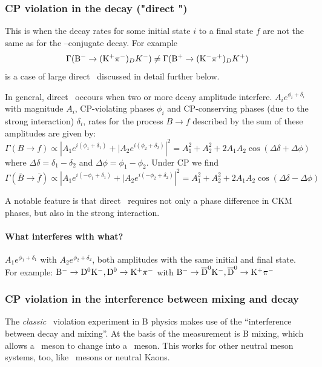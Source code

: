\subsubsection{CP violation in the decay ("direct \cpv")}
This is when the decay rates for some initial state $i$ to a final state $f$ are not the same as for the \cp--conjugate decay. For example
\[
\Gamma({\rm B^-} \to ({\rm K^+}{\rm \pi^-})_D K^-) \neq \Gamma({\rm B^+} \to ({\rm K^-}{\rm \pi^+})_D K^+) 
\]
is a case of large direct \cpv\ discussed in detail further below.

In general, direct \cpv\ occours when two or more decay amplitude interfere. $A_i e^{\phi_i + \delta_i}$ with magnitude $A_i$,  CP-violating phases $\phi_i$ and CP-conserving phases (due to the strong interaction) $\delta_i$, rates for the process $B\to f$ described by the sum of these amplitudes are given by:
\begin{equation}
\Gamma(B \to f) \propto \left| A_1 e^{i\left(\phi_1 + \delta_1\right)} + 
|A_2 e^{i\left(\phi_2 + \delta_2\right)} \right|^2
= A_1^2 + A_2^2 + 2 A_1 A_2 
\cos(\Delta \delta + \Delta \phi)
\end{equation}
where $\Delta\delta = \delta_1 - \delta_2$ and $\Delta \phi = \phi_1 - \phi_2$. Under CP we find
\begin{equation}
\Gamma(\overline{B} \to \overline{f}) \propto \left| A_1 e^{i\left(-\phi_1 + \delta_1\right)} + 
|A_2 e^{i\left(-\phi_2 + \delta_2\right)} \right|^2
= A_1^2 + A_2^2 + 2 A_1 A_2 
\cos(\Delta \delta - \Delta \phi)
\end{equation}

A notable feature is that direct \cpv\ requires not only a phase difference in CKM phases, but also in the strong interaction.

\paragraph{What interferes with what?} 
$A_1 e^{\phi_1 + \delta_1}$ with $A_2 e^{\phi_2 + \delta_2}$, both amplitudes with the same initial and final state. For example:
${\rm B^-} \to {\rm D^{0}} {\rm K^-}, {\rm D^{0}} \to {\rm K^+}{\rm \pi^-}$ with ${\rm B^-} \to {\rm \overline{D}^0} {\rm K^-}, {\rm \overline{D}^0} \to {\rm K^+}{\rm \pi^-}$


\subsubsection{CP violation in the interference between mixing and decay}
 The \emph{classic} \cp\ violation experiment in B physics makes use
 of the ``interference between decay and mixing''. At the basis of the
 measurement is B mixing, which allows a \Bdo\
 meson to change into a \Bdob\ meson. This works for other neutral
 meson systems, too, like \Bso\ mesons or neutral Kaons.

